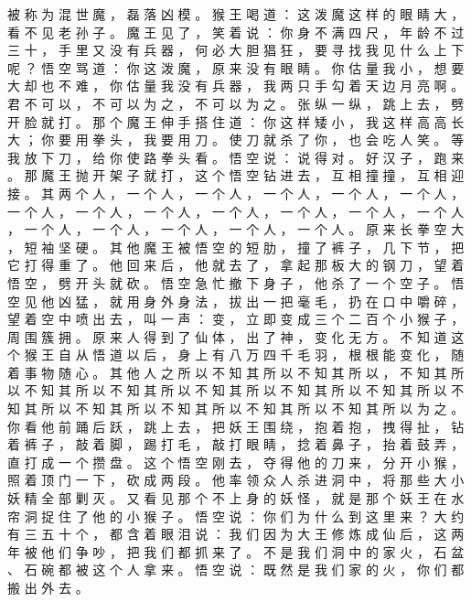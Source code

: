{被 称 为 混 世 魔 ， 磊 落 凶 模 。
猴 王 喝 道 ： 这 泼 魔 这 样 的 眼 睛 大 ， 看 不 见 老 孙 子 。
魔 王 见 了 ， 笑 着 说 ： 你 身 不 满 四 尺 ， 年 龄 不 过 三 十 ， 手 里 又 没 有 兵 器 ， 何 必 大 胆 猖 狂 ， 要 寻 找 我 见 什 么 上 下 呢 ？ 悟 空 骂 道 ： 你 这 泼 魔 ， 原 来 没 有 眼 睛 。
你 估 量 我 小 ， 想 要 大 却 也 不 难 ， 你 估 量 我 没 有 兵 器 ， 我 两 只 手 勾 着 天 边 月 亮 啊 。
君 不 可 以 ， 不 可 以 为 之 ， 不 可 以 为 之 。
张 纵 一 纵 ， 跳 上 去 ， 劈 开 脸 就 打 。
那 个 魔 王 伸 手 搭 住 道 ： 你 这 样 矮 小 ， 我 这 样 高 高 长 大 ； 你 要 用 拳 头 ， 我 要 用 刀 。
使 刀 就 杀 了 你 ， 也 会 吃 人 笑 。
等 我 放 下 刀 ， 给 你 使 路 拳 头 看 。
悟 空 说 ： 说 得 对 。
好 汉 子 ， 跑 来 。
那 魔 王 抛 开 架 子 就 打 ， 这 个 悟 空 钻 进 去 ， 互 相 撞 撞 ， 互 相 迎 接 。
其 两 个 人 ， 一 个 人 ， 一 个 人 ， 一 个 人 ， 一 个 人 ， 一 个 人 ， 一 个 人 ， 一 个 人 ， 一 个 人 ， 一 个 人 ， 一 个 人 ， 一 个 人 ， 一 个 人 ， 一 个 人 ， 一 个 人 ， 一 个 人 ， 一 个 人 ， 一 个 人 。
原 来 长 拳 空 大 ， 短 袖 坚 硬 。
其 他 魔 王 被 悟 空 的 短 肋 ， 撞 了 裤 子 ， 几 下 节 ， 把 它 打 得 重 了 。
他 回 来 后 ， 他 就 去 了 ， 拿 起 那 板 大 的 钢 刀 ， 望 着 悟 空 ， 劈 开 头 就 砍 。
悟 空 急 忙 撤 下 身 子 ， 他 杀 了 一 个 空 子 。
悟 空 见 他 凶 猛 ， 就 用 身 外 身 法 ， 拔 出 一 把 毫 毛 ， 扔 在 口 中 嚼 碎 ， 望 着 空 中 喷 出 去 ， 叫 一 声 ： 变 ， 立 即 变 成 三 个 二 百 个 小 猴 子 ， 周 围 簇 拥 。
原 来 人 得 到 了 仙 体 ， 出 了 神 ， 变 化 无 方 。
不 知 道 这 个 猴 王 自 从 悟 道 以 后 ， 身 上 有 八 万 四 千 毛 羽 ， 根 根 能 变 化 ， 随 着 事 物 随 心 。
其 他 人 之 所 以 不 知 其 所 以 不 知 其 所 以 ， 不 知 其 所 以 不 知 其 所 以 不 知 其 所 以 不 知 其 所 以 不 知 其 所 以 不 知 其 所 以 不 知 其 所 以 不 知 其 所 以 不 知 其 所 以 不 知 其 所 以 不 知 其 所 以 为 之 。
你 看 他 前 踊 后 跃 ， 跳 上 去 ， 把 妖 王 围 绕 ， 抱 着 抱 ， 拽 得 扯 ， 钻 着 裤 子 ， 敲 着 脚 ， 踢 打 毛 ， 敲 打 眼 睛 ， 捻 着 鼻 子 ， 抬 着 鼓 弄 ， 直 打 成 一 个 攒 盘 。
这 个 悟 空 刚 去 ， 夺 得 他 的 刀 来 ， 分 开 小 猴 ， 照 着 顶 门 一 下 ， 砍 成 两 段 。
他 率 领 众 人 杀 进 洞 中 ， 将 那 些 大 小 妖 精 全 部 剿 灭 。
又 看 见 那 个 不 上 身 的 妖 怪 ， 就 是 那 个 妖 王 在 水 帘 洞 捉 住 了 他 的 小 猴 子 。
悟 空 说 ： 你 们 为 什 么 到 这 里 来 ？ 大 约 有 三 五 十 个 ， 都 含 着 眼 泪 说 ： 我 们 因 为 大 王 修 炼 成 仙 后 ， 这 两 年 被 他 们 争 吵 ， 把 我 们 都 抓 来 了 。
不 是 我 们 洞 中 的 家 火 ， 石 盆 、 石 碗 都 被 这 个 人 拿 来 。
悟 空 说 ： 既 然 是 我 们 家 的 火 ， 你 们 都 搬 出 外 去 。
}
